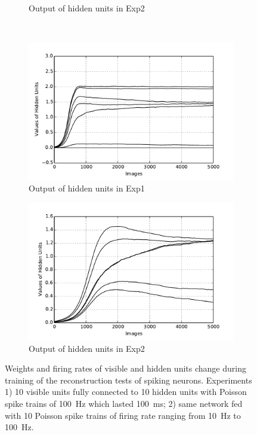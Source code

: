 \begin{figure}
\begin{subfigure}[t]{0.4\textwidth}
			\caption{Output of hidden units in Exp2}
		\end{subfigure}\\
		\begin{subfigure}[t]{0.4\textwidth}
			\includegraphics[width=\textwidth]{pics_ae/exp1_hid_nons.pdf}
			\caption{Output of hidden units in Exp1}
		\end{subfigure}
		\begin{subfigure}[t]{0.4\textwidth}
			\includegraphics[width=\textwidth]{pics_ae/exp2_hid_nons.pdf}
			\caption{Output of hidden units in Exp2}
		\end{subfigure}
		\caption{Weights and firing rates of visible and hidden units change during training of the reconstruction tests of spiking neurons. 
			Experiments 1) 10 visible units fully connected to 10 hidden units with Poisson spike trains of 100~Hz which lasted 100~ms; 2) same network fed with 10 Poisson spike trains of firing rate ranging from 10~Hz to 100~Hz.}
	\end{figure}
